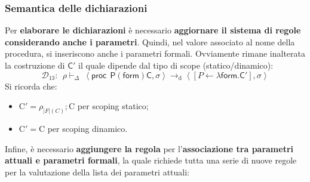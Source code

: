 \documentclass[a4paper]{article}
\begin{document}
	\subsubsection{Semantica delle dichiarazioni}
	
	Per \textbf{elaborare le dichiarazioni} è necessario \textbf{aggiornare il sistema di regole considerando anche i parametri}. Quindi, nel valore associato al nome della procedura, si inseriscono anche i parametri formali. Ovviamente rimane inalterata la costruzione di $\textsf{C}'$ il quale dipende dal tipo di scope (statico/dinamico):
	\begin{equation*}
		\mathcal{D}_{13} : \:\: \rho \vdash_{\Delta} \: \left\langle \textsf{proc} \:\: \textsf{P}\left(\textsf{form}\right)\textsf{C}, \sigma \right\rangle \longrightarrow_{\mathrm{d}} \left\langle \left[P \leftarrow \lambda \textsf{form}.\textsf{C}'\right], \sigma \right\rangle
	\end{equation*}
	Si ricorda che:
	\begin{itemize}
		\item $\mathrm{C}' = \rho_{|F|\left(C\right)} ; \mathrm{C}$ per scoping statico;
		\item $\mathrm{C}' = \mathrm{C}$ per scoping dinamico.
	\end{itemize}
	Infine, è necessario \textbf{aggiungere la regola} per l'\textbf{associazione tra parametri attuali e parametri formali}, la quale richiede tutta una serie di nuove regole per la valutazione della lista dei parametri attuali:
\end{document}
